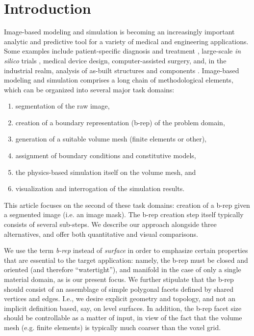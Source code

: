 \section{Introduction}

Image-based modeling and simulation is becoming an increasingly important analytic and predictive tool for a variety of medical and engineering applications. Some examples include patient-specific diagnosis and treatment \cite{neal2010current}, large-scale \textit{in silico} trials \cite{viceconti2016silico}, medical device design, computer-assisted surgery, and, in the industrial realm, analysis of as-built structures and components \cite{bradley2005advances}. Image-based modeling and simulation comprises a long chain of methodological elements, which can be organized into several major task domains:
\begin{enumerate}
\item
segmentation of the raw image, 
\item
creation of a boundary representation (b-rep) of the problem domain,
\item
generation of a suitable volume mesh (finite elements or other), 
\item
assignment
of boundary conditions and constitutive models, 
\item
the physics-based
simulation itself on the volume mesh, and
\item
visualization and interrogation of the simulation results.
\end{enumerate}
This article focuses on the second of these task domains:  creation of a b-rep given a segmented image (i.e. an image mask).  
The b-rep creation step itself typically consists of several sub-steps.  
We describe our approach alongside three alternatives, and offer both quantitative and visual comparisons.

We use the term {\em b-rep} instead of {\em surface}
in order to emphasize certain properties that are essential to the target
application:  namely, the b-rep must be closed and oriented (and therefore
``watertight''), and manifold in the case of only a single material domain, as is our present focus.  We further stipulate that the b-rep should consist of an assemblage of simple polygonal facets defined by shared vertices and 
edges.  I.e., we desire explicit geometry and topology, and not an implicit definition based, say, on level surfaces. In addition, the b-rep facet size should be controllable as a matter of input, in view of the fact that the volume mesh (e.g. finite elements) is typically much coarser than the voxel grid.

